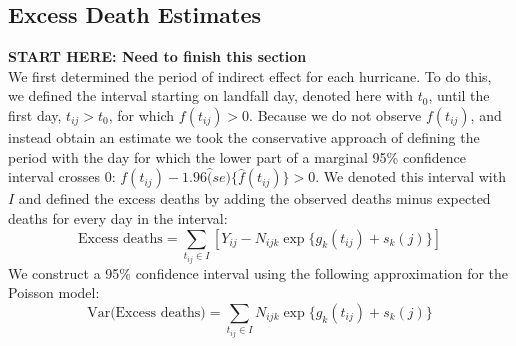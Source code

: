 \documentclass[11pt]{article}
\begin{document}
\subsection{Excess Death Estimates}
\textbf{START HERE: Need to finish this section} \\ 
We first determined the period of indirect effect for each hurricane. To do this, we defined the interval starting on landfall day, denoted here with $t_0$, until the first day, $t_{ij} > t_0$, for which $f(t_{ij})>0$. Because we do not observe $f(t_{ij})$, and instead obtain an estimate we took the conservative approach of defining the period with the day for which the lower part of a marginal 95\% confidence interval crosses 0: $f(t_{ij})−1.96\hat(se)\{\hat{f}(t_{ij})\}>0$. We denoted this interval with $I$ and defined the excess deaths by adding the observed deaths minus expected deaths for every day in the interval:
\begin{equation*}
    \mbox{Excess deaths} = \sum_{t_{ij} \in I} \left[Y_{ij} − N_{ijk}\exp\{g_k(t_{ij})+s_k(j)\}\right]
\end{equation*}
 We construct a 95\% confidence interval using the following approximation for the Poisson model:
 \begin{equation*}
    \mbox{Var(Excess deaths)} = \sum_{t_{ij} \in I} N_{ijk}\exp\{g_k(t_{ij})+s_k(j)\}
 \end{equation*}
\end{document}
